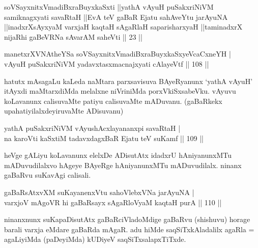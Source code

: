 
\begin{shl}
soVSayxnitxVmadiBxraBuyxkaSxti ||yathA vAyuH puSakxriNiVM samiknagxyati savaRtaH ||EvA teV gaBaR Ejatu sahAveYtu jarAyuNA ||inadxrXsAyxyaM varxjaH kaqtaH sAgaRlaH saparisharxyaH ||taminadxrX nijaRhi gaBeVRNa sAvarAM saheVti || 23 ||
\end{shl}


\begin{shl}
manetxrXVNAtheYSa soVSayxnitxVmadiBxraBuyxkaSxyeVcaCxneYH | \\
vAyuH puSakxriNiVM yadavxtasxmacnajxyati cAlayeVtf \hfill|| 108 || 
\end{shl}

\begin{artha}
hatutx mAsagaLu kaLeda naMtara parxsavisuva BAyeRyanunx `yathA vAyuH' 
itAyxdi maMtarxdiMda melalxne niVriniMda porxVkiSxsabeVku. vAyuvu 
koLavanunx calisu\-vaMte patiyu calisuvaMte mADuvanu. (gaBaRkekx 
upahatiyilalxdeyiruvaMte ADisuvanu)
\end{artha}


\begin{shl}
yathA puSakxriNiVM vAyushAcxlayananxpi savaRtaH | \\
na karoVti kaSxtiM tadavxdagxBaR Ejatu teV suKamf \hfill|| 109 || 
\end{shl}

\begin{artha}
heVge gALiyu koLavanunx elelxDe ADisutAtx idadxrU hAniyanunxMTu 
mADuvudilalxvo hAgeye BAyeRge hAniyanunxMTu mADuvudilalx. ninanx 
gaBaRvu suKavAgi calisali.
\end{artha}

\begin{shl}
gaBaRsAtxvXM suKayanenxVtu sahoVlebxVNa jarAyuNA | \\
varxjoV mAgoVR hi gaBaRsayx sAgaRloV\s yaM kaqtaH purA \hfill|| 110 || 
\end{shl}

\begin{artha}
ninanxnunx suKapaDisutAtx gaBaRciVladoMdige gaBaRvu (shishuvu) horage 
barali varxja eMdare gaBaRda mAgaR. adu hiMde saqSiTxkAladalilx agaRla 
= agaLiyiMda (paDeyiMda) kUDiyeV saqSiTxsalapxTiTxde.
\end{artha}

